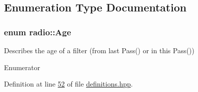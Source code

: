 \subsection{Enumeration Type Documentation}
\hypertarget{namespaceradio_a90839d95c13fa21f45e9cd380e38f1f3}{
\subsubsection[{Age}]{\setlength{\rightskip}{0pt plus 5cm}enum {\bf radio\+::\+Age}}}\label{namespaceradio_a90839d95c13fa21f45e9cd380e38f1f3}
Describes the age of a filter (from last Pass() or in this Pass()) \begin{Desc}
\item[Enumerator]\par
\begin{description}
\item[{\em 
\hypertarget{namespaceradio_a90839d95c13fa21f45e9cd380e38f1f3afbe8ecd067dc1095175b7cdc7cecbb82}{O\+L\+D}\label{namespaceradio_a90839d95c13fa21f45e9cd380e38f1f3afbe8ecd067dc1095175b7cdc7cecbb82}
}]\item[{\em 
\hypertarget{namespaceradio_a90839d95c13fa21f45e9cd380e38f1f3ac1a7d3b0b6d1c9639e94bdd8c8692686}{N\+E\+W}\label{namespaceradio_a90839d95c13fa21f45e9cd380e38f1f3ac1a7d3b0b6d1c9639e94bdd8c8692686}
}]\end{description}
\end{Desc}


Definition at line \hyperlink{definitions_8hpp_source_l00052}{52} of file \hyperlink{definitions_8hpp_source}{definitions.\+hpp}.

